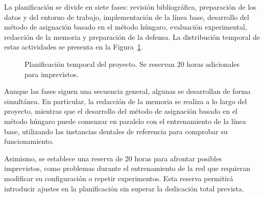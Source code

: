 La planificación se divide en siete fases: revisión bibliográfica, preparación de los datos y del entorno de trabajo, implementación de la línea base, desarrollo del método de asignación basado en el método húngaro, evaluación experimental, redacción de la memoria y preparación de la defensa. La distribución temporal de estas actividades se presenta en la Figura~\ref{fig:gantt}.

\begin{figure}[htbp]
    \centering
    \caption{Planificación temporal del proyecto. Se reservan 20 horas adicionales para imprevistos.}
    \label{fig:gantt}
\end{figure}

Aunque las fases siguen una secuencia general, algunas se desarrollan de forma simultánea. En particular, la redacción de la memoria se realiza a lo largo del proyecto, mientras que el desarrollo del método de asignación basado en el método húngaro puede comenzar en paralelo con el entrenamiento de la línea base, utilizando las instancias dentales de referencia para comprobar su funcionamiento.

Asimismo, se establece una reserva de 20 horas para afrontar posibles imprevistos, como problemas durante el entrenamiento de la red que requieran modificar su configuración o repetir experimentos. Esta reserva permitirá introducir ajustes en la planificación sin superar la dedicación total prevista.

